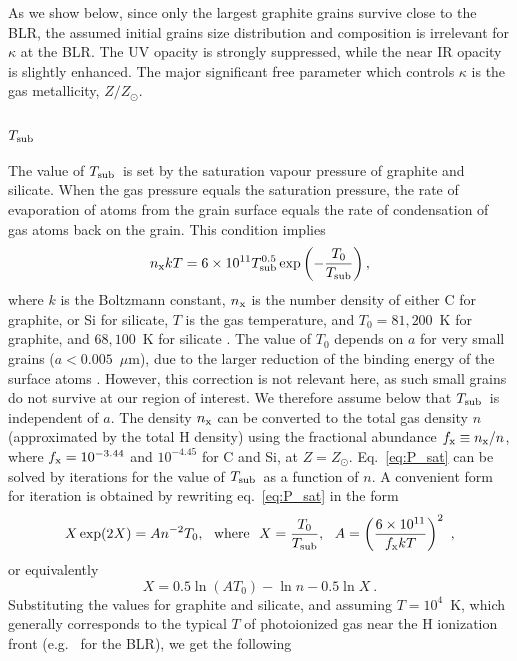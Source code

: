 \documentclass[a4paper,fleqn,usenatbib]{mnras}
\newcommand{\mic}{\mbox{$\mu$m}}
\newcommand{\Tsub}{\mbox{$T_{\rm sub}$}}
\begin{document}
As we show below, since only the largest graphite grains survive close to the BLR, 
the assumed initial grains size distribution and composition is irrelevant for $\kappa$ at the BLR.
The UV opacity is strongly suppressed, while the near IR opacity is slightly enhanced. The major  
significant free parameter which controls $\kappa$ is the gas metallicity, $Z/Z_\odot$.

	
\subsection{\Tsub} \label{sec:T_sub}
	
The value of \Tsub\ is 
set by the saturation vapour pressure of graphite and silicate. When the gas pressure equals the saturation pressure, the rate of evaporation of atoms from the grain surface equals the rate of condensation of gas atoms back on the grain. This condition implies
\begin{equation}
n_{\rm x} k T = 6\times10^{11}T_{\rm sub}^{0.5} \exp\left(-\frac{T_0}{\Tsub}\right), \label{eq:P_sat}
\end{equation}
where $k$ is the Boltzmann constant, $n_{\rm x}$ is the number density of either C for graphite, or Si for silicate, $T$ is the gas temperature, and $T_0=81,200$~K for graphite, and $68,100$~K for silicate \citep{guhathakurta_draine89}. The value of $T_0$
depends on $a$ for very small grains ($a<0.005$~\mic), due to the larger reduction of the binding energy of the surface atoms 
\citep{guhathakurta_draine89}. However, this correction is not relevant here, as such small grains do not survive at our
region of interest. We therefore assume below that \Tsub\ is independent of $a$. 
The density $n_{\rm x}$ can be converted to the total gas density $n$ 
(approximated by the total H density) using the fractional abundance $f_{\rm x}\equiv n_{\rm x}/n$, where $f_{\rm x} = 10^{-3.44}$ and  $10^{-4.45}$ for C and Si, at $Z=Z_{\odot}$. Eq.~\ref{eq:P_sat} can be solved 
by iterations for the value of \Tsub\ as a function of $n$. A convenient form for iteration is obtained by rewriting eq.~\ref{eq:P_sat} in the form
\begin{equation}
X\exp(2X)=An^{-2}T_0 , \ \ {\rm where}\ \ X=\frac{T_0}{\Tsub}, \ \ 
A=\left(\frac{6\times10^{11}}{f_{\rm x} k T}\right)^2\ ,
\end{equation}
or equivalently
\begin{equation}
X = 0.5\ln (AT_0) -\ln n - 0.5\ln X\ .
\end{equation}
Substituting the values for graphite and silicate, and assuming $T=10^4$~K, which generally corresponds to the typical $T$ of photoionized gas near the H ionization front (e.g.\ \citealt{ferland99,paperII} for the BLR), we get the following
\end{document}
